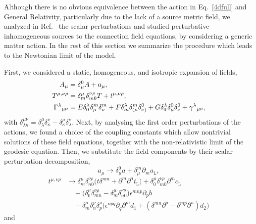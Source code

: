 \documentclass[aps,prd,12pt,twocolumn,superscriptaddress,showpacs,showkeys,reprint%
]{revtex4-1}
\renewcommand{\(}{\left(}
\renewcommand{\)}{\right)}
\renewcommand{\[}{\left[}
\renewcommand{\]}{\right]}
\begin{document}
Although there is no obvious equivalence between the action in Eq.~\eqref{4dfull} and General Relativity, particularly due to the lack of a source metric field, we analyzed in Ref.~\cite{Skirzewski:2014eta} the scalar perturbations and studied perturbative inhomogeneous sources to the connection field equations, by considering a generic matter action. In the rest of this section we summarize the procedure which leads to the Newtonian limit of the model.

First, we considered a static, homogeneous, and isotropic expansion of fields,
\begin{align}
  A_\mu &= \delta_\mu^0 A + a_\mu, \notag \\
  T^{\mu,\nu\rho} &= \delta^{\mu}_m\delta^{\nu\rho}_{m0}T + t^{\mu,\nu\rho},
  \label{GammaExp} \\
  \Gamma^\lambda{}_{\mu\nu} &= E \delta^\lambda_0 \delta^m_\mu \delta^m_\nu + F \delta^\lambda_m \delta^m_{(\mu}\delta^0_{\nu)} + G\delta^\lambda_0 \delta^0_{\mu}\delta^0_{\nu} + \gamma^\lambda{}_{\mu\nu}, \notag
\end{align}
with $\delta^{\mu\nu}_{\lambda\kappa}=\delta^{\mu}_{\lambda}\delta^{\nu}_{\kappa}-\delta^{\mu}_{\kappa}\delta^{\nu}_{\lambda}$. Next, by analysing the first order perturbations of the actions, we found a choice of the coupling constants which allow nontrivial solutions of these field equations, together with the non-relativistic limit of the geodesic equation. Then, we substitute the field components by their scalar perturbation decomposition,
\begin{equation}
  a_\mu \to \delta_\mu^0 a+\delta_\mu^m \partial_{m}a_{\mathtt{L}},
\end{equation}
\begin{equation}
  \begin{split}
    t^{\mu,\nu\rho} &\to \delta^{\mu}_m\delta^{\nu\rho}_{n0} \Big(t \delta^{m n} + \partial^m \partial^n t_{\mathtt{L}} \Big)
    +\delta^{\mu}_0 \delta^{\nu\rho}_{m0} \partial^m c_{\mathtt{L}}
    \\
    & \quad + \Big(\delta^{\mu}_0\delta^{\nu\rho}_{mn}-\delta^{\mu}_m\delta^{\nu\rho}_{n0}\Big)\epsilon^{m n p} \partial_{p} b
    \\
    & \quad +\delta^{\mu}_m \delta^{\nu}_{n} \delta^{\rho}_{p} \Big(\epsilon^{n p q}\partial_q \partial^m d_1 +  (\delta^{m n} \partial^p - \delta^{m p} \partial^n)d_2\Big)
  \end{split}
\end{equation}
and
\end{document}
